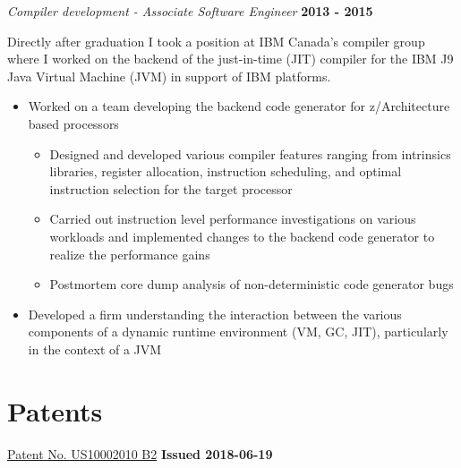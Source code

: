 \documentclass[margin,line]{res}
\begin{document}
\begin{resume}
{\em Compiler development - Associate Software Engineer} \hfill {\bf 2013 - 2015}
\vspace{-.12in}

Directly after graduation I took a position at IBM Canada's compiler group where I worked on the backend of the
just-in-time (JIT) compiler for the IBM J9 Java Virtual Machine (JVM) in support of IBM platforms.

\vspace{.10in}

\begin{itemize}
\item Worked on a team developing the backend code generator for z/Architecture based processors
\begin{itemize}
\item Designed and developed various compiler features ranging from intrinsics libraries, register allocation,
instruction scheduling, and optimal instruction selection for the target processor
\item Carried out instruction level performance investigations on various workloads and implemented changes to
the backend code generator to realize the performance gains
\item Postmortem core dump analysis of non-deterministic code generator bugs
\end{itemize}
\item Developed a firm understanding the interaction between the various components of a dynamic runtime 
environment (VM, GC, JIT), particularly in the context of a JVM
\end{itemize}

\section{\sc Patents}

\begin{list}{}{\leftmargin=0cm}
\item \href{https://patents.google.com/patent/US10002010B2}{Patent No. US10002010 B2} \hfill {\bf Issued 2018-06-19}


\end{list}
\end{resume}
\end{document}
